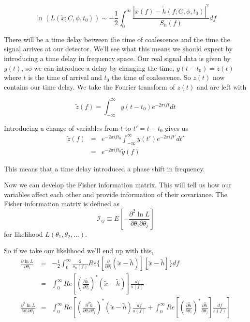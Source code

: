\documentclass{iopart}
\begin{document}
\begin{equation}
	\ln(L(\tilde{x}; C, \phi, t_0)) \sim -\frac{1}{2}\int_0 ^\infty \frac{|\tilde{x}(f) - \tilde{h}(f; C, \phi, t_0)|^2}{S_n(f)}df
\end{equation}

There will be a time delay between the time of coalescence and the time the signal arrives at our detector. We'll see what this means we should expect by introducing a time delay in frequency space. Our real signal data is given by $y(t)$, so we can introduce a delay by changing the time, $y(t - t_0) = z(t)$ where $t$ is the time of arrival and $t_0$ the time of coalescence. So $z(t)$ now contains our time delay. We take the Fourier transform of $z(t)$ and are left with

\begin{equation}
	\tilde{z}(f) = \int^{\infty}_{-\infty}y(t-t_0)e^{-2\pi ift} dt
\end{equation}

Introducing a change of variables from $t$ to $t' = t - t_0$ gives us
\begin{eqnarray}
	\tilde{z}(f) & = & e^{-2\pi ift_0} \int_{-\infty}^{\infty}y(t')e^{-2\pi ift'} dt' \\
	& = & e^{-2\pi ift_0} \tilde{y}(f)
\end{eqnarray}

This means that a time delay introduced a phase shift in frequency. 

Now we can develop the Fisher information matrix. This will tell us how our variables affect each other and provide information of their covariance. The Fisher information matrix is defined as 
\begin{equation}
\mathcal{I}_{ij} \equiv E[-\frac{\partial^2 \ln L}{\partial \theta_i \partial \theta_j}]
\end{equation}
 for likelihood $L(\theta_1, \theta_2, ...)$.

So if we take our likelihood we'll end up with this,
\begin{eqnarray}
	\frac{\partial \ln L}{\partial \theta_i} & = & -\frac{1}{2} \int_0 ^\infty \frac{2}{s_n(f)}Re\{[\frac{\partial}{\partial \theta_i} (\tilde{x} - \tilde{h})][\tilde{x} - \tilde{h}]\}df \\
	& = & \int_0 ^\infty Re[(\frac{\partial \tilde{h}}{\partial \theta_i})^*(\tilde{x} - \tilde{h})]\frac{df}{s(f)} \\
	\frac{\partial^2 \ln L}{\partial \theta_i \partial \theta_j} & = & \int_0 ^\infty Re[(\frac{\partial^2 \tilde{h}}{\partial \theta_i \partial \theta_j})^*(\tilde{x} - \tilde{h})\frac{df}{s(f)} + \int_0 ^\infty Re[(\frac{\partial \tilde{h}}{\partial \theta_i})^*\frac{\partial \tilde{h}}{\partial \theta_j}]\frac{df}{s(f)}] \\
\end{eqnarray}
\end{document}
